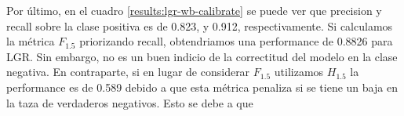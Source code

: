 Por último, en el cuadro \ref{results:lgr-wb-calibrate} se puede ver que
precision y recall sobre la clase positiva es de 0.823, y 0.912,
respectivamente. Si calculamos la métrica $F_{1.5}$ priorizando recall,
obtendriamos una performance de 0.8826 para LGR. Sin embargo, no es un buen
indicio de la correctitud del modelo en la clase negativa. En contraparte, si en
lugar de considerar $F_{1.5}$ utilizamos $H_{1.5}$ la performance es de 0.589
debido a que esta métrica penaliza si se tiene un baja en la taza de verdaderos
negativos. Esto se debe a que 


\begin{table}[t!]
\centering
{}
 \caption{Métricas sobre el conjunto de test del modelo de LGR con word embeddings.}
 \label{results:lgr-wb-calibrate}
\end{table}


